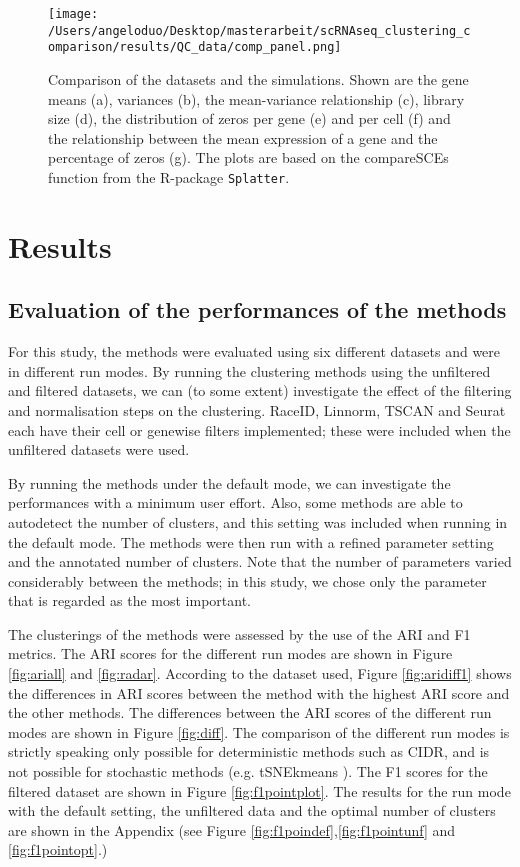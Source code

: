 \documentclass[12pt, a4paper]{article}\usepackage[]{graphicx}\usepackage[]{color}
\begin{document}
\clearpage
\begin{figure}[H]
\texttt{[image: /Users/angeloduo/Desktop/masterarbeit/scRNAseq\_clustering\_comparison/results/QC\_data/comp\_panel.png]}
\caption{Comparison of the datasets and the simulations. Shown are the gene means (a), variances (b), the mean-variance relationship (c), library size (d),  the distribution of zeros per gene (e) and per cell (f) and the relationship between the mean expression of a gene and the percentage of zeros (g). The plots are based on the compareSCEs function from the R-package \texttt{Splatter}.}
\label{fig:compare}
\end{figure}

\section{Results}
\subsection{Evaluation of the performances of the methods}

For this study, the methods were evaluated using six different datasets and were in different run modes. By running the clustering methods using the unfiltered and filtered datasets, we can (to some extent) investigate the effect of the filtering and normalisation steps on the clustering. RaceID, Linnorm, TSCAN and Seurat each have their cell or genewise filters implemented; these were included when the unfiltered datasets were used. 

By running the methods under the default mode, we can investigate the performances with a minimum user effort. Also, some methods are able to autodetect the number of clusters, and this setting was included when running in the default mode. The methods were then run with a refined parameter setting and the annotated number of clusters. Note that the number of parameters varied considerably between the methods; in this study, we chose only the parameter that is regarded as the most important.

The clusterings of the methods were assessed by the use of the ARI and F1 metrics. The ARI scores for the different run modes are shown in Figure \ref{fig:ariall} and \ref{fig:radar}. According to the dataset used, Figure \ref{fig:aridiff1} shows the differences in ARI scores between the method with the highest ARI score and the other methods. The differences between the ARI scores of the different run modes are shown in Figure \ref{fig:diff}. The comparison of the different run modes is strictly speaking only possible for deterministic methods such as CIDR, and is not possible for stochastic methods (e.g. tSNEkmeans ). The F1 scores for the filtered dataset are shown in Figure \ref{fig:f1pointplot}. The results for the run mode with the default setting, the unfiltered data and the optimal number of clusters are shown in the Appendix (see Figure \ref{fig:f1poindef},\ref{fig:f1pointunf} and \ref{fig:f1pointopt}.)
\end{document}
